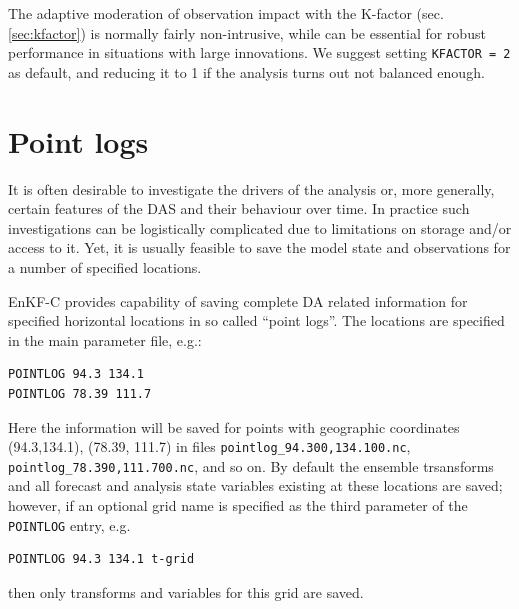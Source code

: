 \documentclass[11pt]{report}
\begin{document}
The adaptive moderation of observation impact with the K-factor (sec. \ref{sec:kfactor}) is normally fairly non-intrusive, while can be essential for robust performance in situations with large innovations.
We suggest setting \verb|KFACTOR = 2| as default, and reducing it to 1 if the analysis turns out not balanced enough.

\section{Point logs}
\label{sec:pointlogs}

It is often desirable to investigate the drivers of the analysis or, more generally, certain features of the DAS and their behaviour over time.
In practice such investigations can be logistically complicated due to limitations on storage and/or access to it.
Yet, it is usually feasible to save the model state and observations for a number of specified locations.

EnKF-C provides capability of saving complete DA related information for specified horizontal locations in so called ``point logs''.
The locations are specified in the main parameter file, e.g.:
\begin{Verbatim}
POINTLOG 94.3 134.1
POINTLOG 78.39 111.7
\end{Verbatim}
Here the information will be saved for points with geographic coordinates (94.3,134.1), (78.39, 111.7) in files \verb|pointlog_94.300,134.100.nc|, \verb|pointlog_78.390,111.700.nc|, and so on.
By default the ensemble trsansforms and all forecast and analysis state variables existing at these locations are saved; however, if an optional grid name is specified as the third parameter of the \verb|POINTLOG| entry, e.g.
\begin{Verbatim}
POINTLOG 94.3 134.1 t-grid
\end{Verbatim}
then only transforms and variables for this grid are saved.
\end{document}

